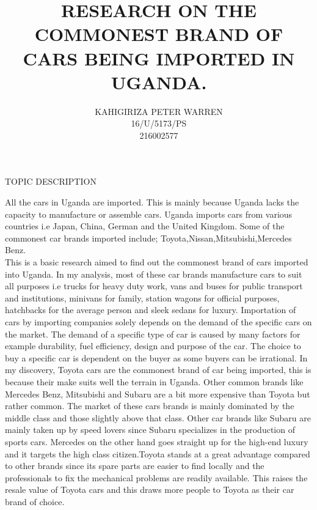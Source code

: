 \documentclass[10pt,a4paper]{report}
\author{KAHIGIRIZA PETER WARREN \\
16/U/5173/PS\\
216002577
}
\title{RESEARCH ON THE COMMONEST BRAND OF CARS BEING IMPORTED IN UGANDA.}
\begin{document}
	 \begin{center}
		\maketitle \begin{Large}
		{TOPIC DESCRIPTION}
		\end{Large}
	\end{center}
		\begin{flushleft}
		All the cars in Uganda are imported. This is mainly because Uganda lacks the capacity to manufacture or assemble cars. Uganda imports cars from various countries i.e Japan, China, German and the United Kingdom. Some of the commonest car brands imported include; Toyota,Nissan,Mitsubishi,Mercedes Benz.\\
		This is a basic research aimed to find out the commonest brand of cars imported into Uganda. In my analysis, most of these car brands manufacture cars to suit all purposes i.e trucks for heavy duty work, vans and buses for public transport and institutions, minivans for family, station wagons for official purposes, hatchbacks for the average person and sleek sedans for luxury. Importation of cars by importing companies solely depends on the demand of the specific cars on the market. The demand of a specific type of car is caused by many factors for example durability, fuel efficiency, design and purpose of the car. The choice to buy a specific car is dependent on the buyer as some buyers can be irrational. In my discovery, Toyota cars are the commonest brand of car being imported, this is because their make suits well the terrain in Uganda. Other common brands like Mercedes Benz, Mitsubishi and Subaru are a bit more expensive than Toyota but rather common. The market of these cars brands is mainly dominated by the middle class and those slightly above that class.  Other car brands like Subaru are mainly taken up by speed lovers since Subaru specializes in the production of sports cars. Mercedes on the other hand goes straight up for the high-end luxury and it targets the high class citizen.Toyota stands at a great advantage compared to other brands since its spare parts are easier to find locally and the professionals to fix the mechanical problems are readily available. This raises the resale value of Toyota cars and this draws more people to Toyota as their car brand of choice.  
		\end{flushleft}
\end{document}
